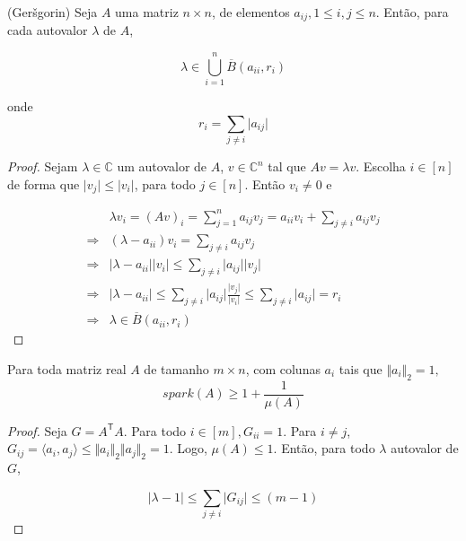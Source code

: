 \begin{teorema}
(Ger\v{s}gorin) \cite{horn2012matrix} Seja $A$ uma matriz $n \times n$, de elementos $a_{ij}, 1\leq i,j \leq n$. Então, para cada autovalor $\lambda$ de $A$,

$$ \lambda \in \bigcup_{i = 1}^n \overline{B}(a_{ii}, r_i) $$

onde $$r_i = \sum_{j \neq i} \vert a_{ij} \vert$$
\end{teorema}
\begin{proof}
Sejam $\lambda \in \mathbb{C}$ um autovalor de $A$, $v \in \mathbb{C}^{n}$ tal que $Av = \lambda v$. Escolha $i \in [n]$ de forma que $\vert v_j \vert \leq \vert v_i \vert$, para todo $j \in [n]$. Então $v_i \neq 0$ e

\begin{subequations}
\begin{align*}
& \lambda v_i = (Av)_i
= \sum_{j = 1}^n a_{ij}v_j
= a_{ii}v_i + \sum_{j \neq i} a_{ij}v_j
\\ \Rightarrow &
(\lambda - a_{ii})v_i = \sum_{j \neq i} a_{ij}v_j
\\ \Rightarrow &
\vert \lambda - a_{ii} \vert \vert v_i \vert \leq \sum_{j \neq i} \vert a_{ij} \vert \vert v_j \vert
\\ \Rightarrow &
\vert \lambda - a_{ii} \vert \leq
\sum_{j \neq i} \vert a_{ij} \vert \frac{ \vert v_j \vert}{\vert v_i \vert}
\leq \sum_{j \neq i} \vert a_{ij} \vert = r_i
\\ \Rightarrow &
\lambda \in \overline{B}(a_{ii}, r_i)
\end{align*}
\end{subequations}
\end{proof}

\begin{lema}
Para toda matriz real $A$ de tamanho $m \times n$, com colunas $a_i$ tais que $\Vert a_i \Vert_2 = 1,$
$$spark(A) \geq 1 + \frac{1}{\mu(A)}$$
\end{lema}
\begin{proof}
Seja $G = A^{\mathsf{T}}A$. Para todo  $i \in [m], G_{ii} = 1$. Para $i \neq j$, $G_{ij} = \langle a_i, a_j \rangle \leq \Vert a_i \Vert_2 \Vert a_j \Vert_2 = 1$. Logo, $\mu(A) \leq 1$. Então, para todo $\lambda$ autovalor de $G$,

$$ \vert \lambda - 1 \vert \leq \sum_{j \neq i} \vert G_{ij} \vert \leq (m - 1)$$

\end{proof}

